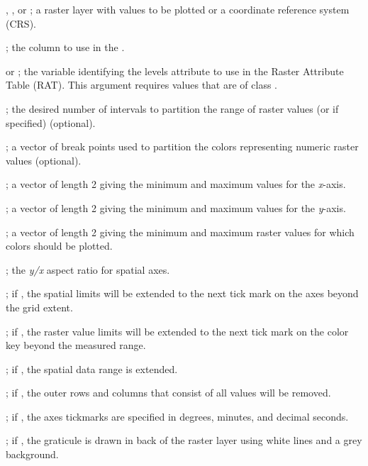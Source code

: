 \documentclass[letterpaper]{book}
\begin{document}
\begin{Arguments}
\begin{ldescription}
\item[\code{r}] , , or ; a raster layer with values to be plotted or a coordinate reference system (CRS).
\item[\code{layer}] ; the column to use in the .
\item[\code{att}]  or ; the variable identifying the levels attribute to use in the Raster Attribute Table (RAT).
This argument requires  values that are of class .
\item[\code{n}] ; the desired number of intervals to partition the range of raster values (or  if specified) (optional).
\item[\code{breaks}] ; a vector of break points used to partition the colors representing numeric raster values (optional).
\item[\code{xlim}] ; a vector of length 2 giving the minimum and maximum values for the \emph{x}-axis.
\item[\code{ylim}] ; a vector of length 2 giving the minimum and maximum values for the \emph{y}-axis.
\item[\code{zlim}] ; a vector of length 2 giving the minimum and maximum raster values for which colors should be plotted.
\item[\code{asp}] ; the \emph{y/x} aspect ratio for spatial axes.
\item[\code{extend.xy}] ; if , the spatial limits will be extended to the next tick mark on the axes beyond the grid extent.
\item[\code{extend.z}] ; if , the raster value limits will be extended to the next tick mark on the color key beyond the measured range.
\item[\code{reg.axs}] ; if , the spatial data range is extended.
\item[\code{trim.r}] ; if , the outer rows and columns that consist of all  values will be removed.
\item[\code{dms.tick}] ; if , the axes tickmarks are specified in degrees, minutes, and decimal seconds.
\item[\code{bg.lines}] ; if , the graticule is drawn in back of the raster layer using white lines and a grey background.

\end{ldescription}
\end{Arguments}
\end{document}

